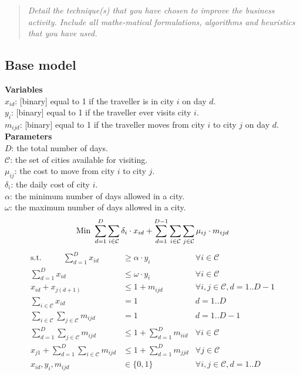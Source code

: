 \documentclass[12pt]{article}
\begin{document}
\begin{quote} \textit{
Detail the technique(s) that you have chosen to improve the business activity. Include all mathe-matical formulations, algorithms and heuristics that you have used.
} \end{quote}

\subsection{Base model}


\textbf{Variables} \\
$x_{id}$: [binary] equal to 1 if the traveller is in city $i$ on day $d$. \\ 	%
$y_{i}$: [binary] equal to 1 if the traveller ever visits city $i$. \\		%
$m_{ijd}$: [binary] equal to 1 if the traveller moves from city $i$ to city $j$ on day $d$. \\	%

\textbf{Parameters}\\
$D$: the total number of days. \\
$\mathcal{C}$: the set of cities available for visiting. \\
$\mu_{ij}$: the cost to move from city $i$ to city $j$. \\
$\delta_{i}$: the daily cost of city $i$. \\
$\alpha$: the minimum number of days allowed in a city. \\
$\omega$: the maximum number of days allowed in a city. \\

\begin{equation*}
\text{Min } \sum_{d=1}^{D} \sum_{i \in \mathcal{C}} \delta_{i} \cdot x_{id} + \sum_{d=1}^{D-1} \sum_{i \in \mathcal{C}} \sum_{j \in \mathcal{C}} \mu_{ij} \cdot m_{ijd}\\
\end{equation*}
\begin{align}
\text{s.t.~~~~~~~~} \sum_{d=1}^{D} x_{id} & \geq \alpha \cdot y_{i} & \forall i \in \mathcal{C}\\
\sum_{d=1}^{D} x_{id} & \leq \omega \cdot y_{i} &  \forall i \in \mathcal{C}\\
x_{id} + x_{j(d+1)} & \leq 1 + m_{ijd} & \forall i,j \in \mathcal{C}, d = 1..D-1 \\
\sum_{i \in \mathcal{C}} x_{id} &= 1 & d = 1..D \\
\sum_{i \in \mathcal{C}} \sum_{j \in \mathcal{C}} m_{ijd} &= 1 & d = 1..D-1 \\
\sum_{d=1}^{D} \sum_{j \in \mathcal{C}} m_{ijd} &\leq 1 + \sum_{d=1}^{D} m_{iid} & \forall i \in \mathcal{C} \\
x_{j1} + \sum_{d=1}^{D} \sum_{i \in \mathcal{C}} m_{ijd} &\leq 1 + \sum_{d=1}^{D} m_{jjd} & \forall j \in \mathcal{C}\\
x_{id}, y_{i}, m_{ijd} & \in \{0,1\} & \forall i, j \in \mathcal{C}, d = 1..D
\end{align}
\end{document}
